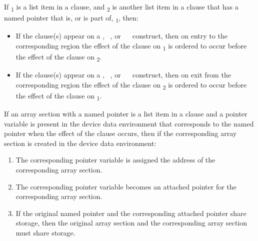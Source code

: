 \begin{ccppspecific}

If \textsubscript{1} is a list item in a  clause, and
\textsubscript{2} is another list item in a  clause that has a named
pointer that is, or is part of, \textsubscript{1}, then:

\begin{itemize}

\item If the  clause(s) appear on a ,
~, or ~~ construct,
then on entry to the corresponding region the effect of the  clause
on \textsubscript{1} is ordered to occur before the effect of the  clause
on \textsubscript{2}.

\item If the  clause(s) appear on a ,
~, or ~~ construct,
then on exit from the corresponding region the effect of the  clause
on \textsubscript{2} is ordered to occur before the effect of the  clause
on \textsubscript{1}.

\end{itemize}


If an array section with a named pointer is a list item in a  clause
and a pointer variable is present in the device data environment that
corresponds to the named pointer when the effect of the  clause
occurs, then if the corresponding array section is created in the device data
environment: \begin{enumerate}

\item The corresponding pointer variable is assigned the address of the
corresponding array section.

\item The corresponding pointer variable becomes an attached pointer
for the corresponding array section.

\item If the original named pointer and the corresponding attached pointer
share storage, then the original array section and the corresponding array
section must share storage. 

\end{enumerate}

\end{ccppspecific}

